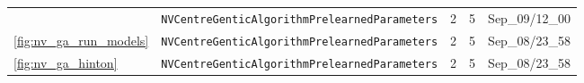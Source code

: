\begin{tabular}{lllll}
                        & \texttt{NVCentreGenticAlgorithmPrelearnedParameters} &                                        2 &                                        5 &                           Sep\_09/12\_00 \\
\cline{1-5}
\cref{fig:nv_ga_run_models} & \texttt{NVCentreGenticAlgorithmPrelearnedParameters} &                                        2 &                                        5 &                           Sep\_08/23\_58 \\
\cref{fig:nv_ga_hinton} & \texttt{NVCentreGenticAlgorithmPrelearnedParameters} &                                        2 &                                        5 &                           Sep\_08/23\_58 \\
\hline
\end{tabular}
